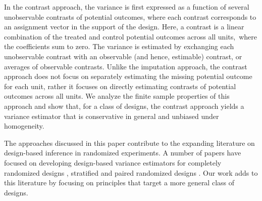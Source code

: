 \documentclass[12pt]{article}
\begin{document}
In the contrast approach, the variance is first expressed as a function of several unobservable contrasts of potential outcomes, where each contrast corresponds to an assignment vector in the support of the design. Here, a contrast is a linear combination of the treated and control potential outcomes across all units, where the coefficients sum to zero.
The variance is estimated by exchanging each unobservable contrast with an observable (and hence, estimable) contrast, or averages of observable contrasts. Unlike the imputation approach, the contrast approach does not focus on separately estimating the missing potential outcome for each unit, rather it focuses on directly estimating contrasts of potential outcomes across all units. We analyze the finite sample properties of this approach and show that, for a class of designs, the contrast approach yields a variance estimator that is conservative in general and unbiased under homogeneity. 


The approaches discussed in this paper contribute to the expanding literature on design-based inference in randomized experiments. A number of papers have focused on developing design-based variance estimators for completely randomized designs \cite{robins1988confidence, aronow2014sharp, nutz2022directional}, stratified and paired randomized designs \cite{kempthorne1955randomization, wilk1955randomization, gadbury2001randomization, abadie2008estimation, imai2008variance, higgins2015blocking, fogarty2018mitigating, pashley2021insights, luo2023interval}. Our work adds to this literature by focusing on principles that target a more general class of designs. 
\end{document}
